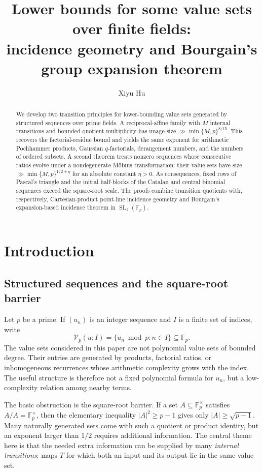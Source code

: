 \documentclass[11pt,reqno]{amsart}
\title{Lower bounds for some value sets over finite fields:\\ incidence geometry and Bourgain's group expansion theorem}
\author{Xiyu Hu}
\date{}
\numberwithin{equation}{section}
\theoremstyle{definition}
\theoremstyle{remark}
\newcommand{\F}{\mathbb F}
\newcommand{\SL}{\operatorname{SL}}
\newcommand{\cV}{\mathcal V}
\begin{document}
\begin{abstract}
We develop two transition principles for lower-bounding value sets generated by structured sequences over prime fields.  A reciprocal-affine family with $M$ internal transitions and bounded quotient multiplicity has image size $\gg \min\{M,p\}^{8/15}$.  This recovers the factorial-residue bound and yields the same exponent for arithmetic Pochhammer products, Gaussian $q$-factorials, derangement numbers, and the numbers of ordered subsets.  A second theorem treats nonzero sequences whose consecutive ratios evolve under a nondegenerate M\"obius transformation: their value sets have size $\gg \min\{M,p\}^{1/2+\eta}$ for an absolute constant $\eta>0$.  As consequences, fixed rows of Pascal's triangle and the initial half-blocks of the Catalan and central binomial sequences exceed the square-root scale.  The proofs combine transition quotients with, respectively, Cartesian-product point-line incidence geometry and Bourgain's expansion-based incidence theorem in $\SL_2(\F_p)$.
\end{abstract}

\maketitle
\tableofcontents

\section{Introduction}

\subsection{Structured sequences and the square-root barrier}

Let $p$ be a prime.  If $(u_n)$ is an integer sequence and $I$ is a finite set of indices, write
\begin{equation}\label{eq:value-set-definition}
  \cV_p(u;I)=\{u_n\bmod p:n\in I\}\subseteq\F_p.
\end{equation}
The value sets considered in this paper are not polynomial value sets of bounded degree.  Their entries are generated by products, factorial ratios, or inhomogeneous recurrences whose arithmetic complexity grows with the index.  The useful structure is therefore not a fixed polynomial formula for $u_n$, but a low-complexity relation among nearby terms.

The basic obstruction is the square-root barrier.  If a set $A\subseteq\F_p^\times$ satisfies $A/A=\F_p^\times$, then the elementary inequality $|A|^2\ge p-1$ gives only $|A|\ge\sqrt{p-1}$.  Many naturally generated sets come with such a quotient or product identity, but an exponent larger than $1/2$ requires additional information.  The central theme here is that the needed extra information can be supplied by many \emph{internal transitions}: maps $T$ for which both an input and its output lie in the same value set.
\end{document}
